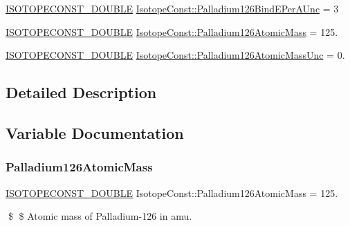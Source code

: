 \begin{DoxyCompactItemize}
\mbox{\hyperlink{group___isotope_const-_macros_ga8f45a7272ce02c0b4c65c44636ed719a}{I\+S\+O\+T\+O\+P\+E\+C\+O\+N\+S\+T\+\_\+\+D\+O\+U\+B\+LE}} \mbox{\hyperlink{group___isotope_const-_palladium-_pd126_gaebe564e3e94bf5ac00b9e06e07d1ae98}{Isotope\+Const\+::\+Palladium126\+Bind\+E\+Per\+A\+Unc}} = 3
\item 
\mbox{\hyperlink{group___isotope_const-_macros_ga8f45a7272ce02c0b4c65c44636ed719a}{I\+S\+O\+T\+O\+P\+E\+C\+O\+N\+S\+T\+\_\+\+D\+O\+U\+B\+LE}} \mbox{\hyperlink{group___isotope_const-_palladium-_pd126_gacf4c38646818637a26adfe48f45b7d9e}{Isotope\+Const\+::\+Palladium126\+Atomic\+Mass}} = 125.
\item 
\mbox{\hyperlink{group___isotope_const-_macros_ga8f45a7272ce02c0b4c65c44636ed719a}{I\+S\+O\+T\+O\+P\+E\+C\+O\+N\+S\+T\+\_\+\+D\+O\+U\+B\+LE}} \mbox{\hyperlink{group___isotope_const-_palladium-_pd126_gac2aa45ab6aa39110004d6e29758093df}{Isotope\+Const\+::\+Palladium126\+Atomic\+Mass\+Unc}} = 0.
\end{DoxyCompactItemize}


\subsection{Detailed Description}


\subsection{Variable Documentation}
\mbox{\label{group___isotope_const-_palladium-_pd126_gacf4c38646818637a26adfe48f45b7d9e}} 
\subsubsection{\texorpdfstring{Palladium126\+Atomic\+Mass}{Palladium126AtomicMass}}
{\footnotesize\ttfamily \mbox{\hyperlink{group___isotope_const-_macros_ga8f45a7272ce02c0b4c65c44636ed719a}{I\+S\+O\+T\+O\+P\+E\+C\+O\+N\+S\+T\+\_\+\+D\+O\+U\+B\+LE}} Isotope\+Const\+::\+Palladium126\+Atomic\+Mass = 125.}

\$ \$ Atomic mass of Palladium-\/126 in amu. \mbox{\label{group___isotope_const-_palladium-_pd126_gac2aa45ab6aa39110004d6e29758093df}} 
